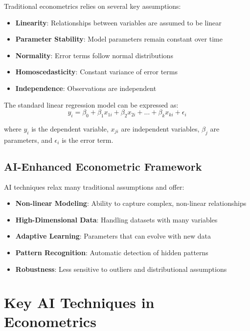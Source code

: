 \documentclass[12pt,a4paper]{article}
\begin{document}
Traditional econometrics relies on several key assumptions:

\begin{itemize}
    \item \textbf{Linearity}: Relationships between variables are assumed to be linear
    \item \textbf{Parameter Stability}: Model parameters remain constant over time
    \item \textbf{Normality}: Error terms follow normal distributions
    \item \textbf{Homoscedasticity}: Constant variance of error terms
    \item \textbf{Independence}: Observations are independent
\end{itemize}

The standard linear regression model can be expressed as:
\begin{equation}
y_i = \beta_0 + \beta_1 x_{1i} + \beta_2 x_{2i} + \ldots + \beta_k x_{ki} + \epsilon_i
\end{equation}

where $y_i$ is the dependent variable, $x_{ji}$ are independent variables, $\beta_j$ are parameters, and $\epsilon_i$ is the error term.

\subsection{AI-Enhanced Econometric Framework}

AI techniques relax many traditional assumptions and offer:

\begin{itemize}
    \item \textbf{Non-linear Modeling}: Ability to capture complex, non-linear relationships
    \item \textbf{High-Dimensional Data}: Handling datasets with many variables
    \item \textbf{Adaptive Learning}: Parameters that can evolve with new data
    \item \textbf{Pattern Recognition}: Automatic detection of hidden patterns
    \item \textbf{Robustness}: Less sensitive to outliers and distributional assumptions
\end{itemize}

\section{Key AI Techniques in Econometrics}
\end{document}
